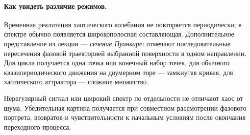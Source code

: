 \paragraph{Как увидеть различие режимов.}
Временная реализация хаотического колебания не повторяется периодически; в спектре обычно появляется широкополосная составляющая. Дополнительное представление из лекции --- \emph{сечение Пуанкаре}: отмечают последовательные пересечения фазовой траекторией выбранной поверхности в одном направлении. Для цикла получается одна точка или конечный набор точек, для обычного квазипериодического движения на двумерном торе --- замкнутая кривая, для хаотического аттрактора --- сложное множество.

Нерегулярный сигнал или широкий спектр по отдельности не отличают хаос от шума. Убедительная картина получается при совместном рассмотрении фазового портрета, возвратов и чувствительности к начальным условиям после окончания переходного процесса.
